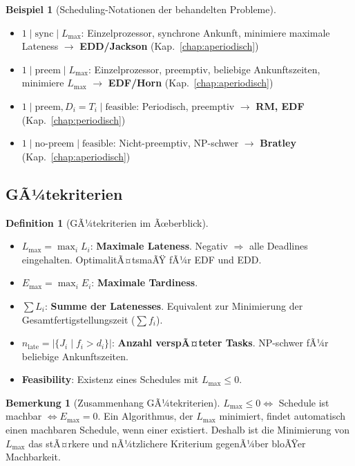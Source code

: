 ﻿\documentclass[a4paper,12pt]{report}
\theoremstyle{definition}
\newtheorem{definition}{Definition}[chapter]
\newtheorem{beispiel}{Beispiel}[chapter]
\newtheorem{bemerkung}{Bemerkung}[chapter]
\begin{document}
\begin{beispiel}[Scheduling-Notationen der behandelten Probleme]
	\begin{itemize}
		\item $1 \mid \text{sync} \mid L_{\max}$: Einzelprozessor, synchrone
		      Ankunft, minimiere maximale Lateness $\to$ \textbf{EDD/Jackson} (Kap.~\ref{chap:aperiodisch})
		\item $1 \mid \text{preem} \mid L_{\max}$: Einzelprozessor, preemptiv,
		      beliebige Ankunftszeiten, minimiere $L_{\max}$ $\to$ \textbf{EDF/Horn} (Kap.~\ref{chap:aperiodisch})
		\item $1 \mid \text{preem}, D_i=T_i \mid \text{feasible}$: Periodisch,
		      preemptiv $\to$ \textbf{RM, EDF} (Kap.~\ref{chap:periodisch})
		\item $1 \mid \text{no-preem} \mid \text{feasible}$: Nicht-preemptiv,
		      NP-schwer $\to$ \textbf{Bratley} (Kap.~\ref{chap:aperiodisch})
	\end{itemize}
\end{beispiel}

\subsection{GÃ¼tekriterien}

\begin{definition}[GÃ¼tekriterien im Ãœberblick]
	\begin{itemize}
		\item $L_{\max} = \max_i L_i$: \textbf{Maximale Lateness}. Negativ $\Rightarrow$
		      alle Deadlines eingehalten. OptimalitÃ¤tsmaÃŸ fÃ¼r EDF und EDD.
		\item $E_{\max} = \max_i E_i$: \textbf{Maximale Tardiness}.
		\item $\sum L_i$: \textbf{Summe der Latenesses}. Equivalent zur Minimierung
		      der Gesamtfertigstellungszeit ($\sum f_i$).
		\item $n_{\text{late}} = |\{J_i \mid f_i > d_i\}|$: \textbf{Anzahl verspÃ¤teter
		      Tasks}. NP-schwer fÃ¼r beliebige Ankunftszeiten.
		\item \textbf{Feasibility}: Existenz eines Schedules mit $L_{\max} \leq 0$.
	\end{itemize}
\end{definition}

\begin{bemerkung}[Zusammenhang GÃ¼tekriterien]
	$L_{\max} \leq 0 \iff$ Schedule ist machbar $\iff E_{\max} = 0$.
	Ein Algorithmus, der $L_{\max}$ minimiert, findet automatisch einen
	machbaren Schedule, wenn einer existiert. Deshalb ist die Minimierung
	von $L_{\max}$ das stÃ¤rkere und nÃ¼tzlichere Kriterium gegenÃ¼ber
	bloÃŸer Machbarkeit.
\end{bemerkung}
\end{document}
